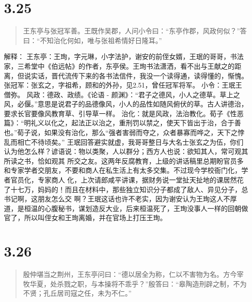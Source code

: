 \documentclass[]{book}
\begin{document}
\section{3.25}\label{section-179}

\begin{quote}
王东亭与张冠军善。王既作吴郡，人问小令曰：``东亭作郡，风政何似？''答曰：``不知治化何如，唯与张祖希情好日隆耳。''
\end{quote}

解释：
王东亭：王珣，字元琳，小字法护，谢安的前侄女婿，王珉的哥哥，书法家，三希堂中《伯远帖》的作者，东亭侯。王珣书法潇洒，看不出与王献之的距离，但说实话，晋代流传下来的各书法信件，我没一个读得通，读得懂的，惭愧。
张冠军：张玄之，字祖希，顾和的外孙，见2.51，曾任冠军将军。
小令：王珉王僧弥。 风政：德政、政绩。《论语 -
颜渊》：``君子之德风，小人之德草。草上之风，必偃。''意思是说君子的品德像风，小人的品性如随风俯伏的草。古人讲德治，要求长官要像风教育草、引导草一样。
治化：就是风政，法治教化。荀子《性恶篇》：``明礼义以化之，起法正以治之，重刑罚以禁之，使天下皆出于治，合于善也。''荀子说，如果没有治化，那么``强者害弱而夺之，众者暴寡而哗之，天下之悖乱而相亡不待顷矣。''
王珉回答避实就虚，我哥哥整日与大名士张玄之为伍，你们认为他怎么样？谚语说：物以类聚，人以群分；西方人也说：欲知其人，常可观其所读之书，恰如观其
所交之友。这两年反腐教育，上级的讲话稿里总期盼官员多和专家学者交朋友，不要和商人在私生活上有太多交集。不过现今学校衙门化，学者官员化，专家商人
化，上次请郎咸平讲课，据财务说一堂扯天扯地的课居然花了十七万，妈妈的！而且在材料中，那些独立知识分子都成了敌人、异见分子，总书记啊，这朋友怎么交
啊？王珉这话也许不老实，因为谢安认为王珣这人不厚道，是桓温的心腹秘书，谋划造反大业，后来桓温死了，王珣没事人一样的回朝做官了，所以叫侄女和王珣离婚，并在官场上打压王珣。

\section{3.26}\label{section-180}

\begin{quote}
殷仲堪当之荆州，王东亭问曰：``德以居全为称，仁以不害物为名。方今宰牧华夏，处杀戮之职，与本操将不乖乎？''殷答曰：``皋陶造刑辟之制，不为不贤；孔丘居司寇之任，未为不仁。''
\end{quote}
\end{document}
